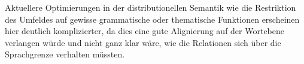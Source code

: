 \documentclass[11pt,twoside,openright]{mpreport}
\begin{document}
Aktuellere Optimierungen in der distributionellen Semantik wie die Restriktion des Umfeldes auf gewisse grammatische oder thematische Funktionen erscheinen hier deutlich komplizierter, da dies eine gute Alignierung auf der Wortebene verlangen würde und nicht ganz klar wäre, wie die Relationen sich über die Sprachgrenze verhalten müssten.


\end{document}
